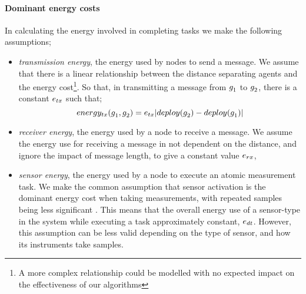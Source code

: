 \paragraph{Dominant energy costs}
\label{section:problem:dominant_energy_costs}
\newcommand{\formalTransmissionEnergy}[2]{
	\functionFormal{energy_{\symbolTransmission{}{}}}
	{\setAgent{}{} \times \setAgent{}{}}
	{\setRealNumbersPositive{}{}}
}
\newcommand{\functionTransmissionEnergy}[2]{
	\functionSignature{energy_{\symbolTransmission{}{}}}
	{\varAgent{#1}{},\varAgent{#2}{}}
}
\newcommand{\functionTransmissionEnergyIndexed}[2]{
	\functionTransmissionEnergy{\varAgent{i}{}}{\varAgent{i+1}{}}
}
In calculating the energy involved in completing tasks we make the following assumptions;
\begin{itemize}
	\item \textit{transmission energy}, the energy used by nodes to send a message. We assume that there is a linear relationship between the distance separating agents and the energy cost\footnote{A more complex relationship could be modelled with no expected impact on the effectiveness of our algorithms}. So that, in transmitting a message from $g_{1}^{}$ to $g_{2}^{}$, there is a constant $\varTransmissionEnergy{}{}$ such that;
	\begin{equation}
		\functionTransmissionEnergy{1}{2}
		=  \varTransmissionEnergy{}{}\funcSize{\functionDeployment{\varAgent{2}{}}{} - \functionDeployment{\varAgent{1}{}}{}}
	\end{equation}
	\item \textit{receiver energy}, the energy used by a node to receive a message. We assume the energy use for receiving a message in not dependent on the distance, and ignore the impact of message length, to give a constant value $\varReceiverEnergy{}{}$, 
	\item \textit{sensor energy}, the energy used by a node to execute an atomic measurement task. We make the common assumption that sensor activation is the dominant energy cost when taking measurements, with repeated samples being less significant \citep{Razzaque2014}. This means that the overall energy use of a sensor-type in the system while executing a task approximately constant, $\varSensorEnergy{}{}$. However, this assumption can be less valid depending on the type of sensor, and how its instruments take samples.
\end{itemize}
